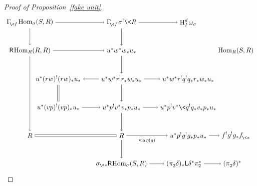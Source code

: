 \documentclass{compositio}
\theoremstyle{plain}
\theoremstyle{definition}
\theoremstyle{remark}
\numberwithin{equation}{thm}
\begin{document}
\begin{proof}[Proof of Proposition~\ref{fake unit}]
\[ \begin{tikzpicture}[xscale=3.75, yscale=1.5]

   \node(11) at (1,-1){$\Gamma^{}_{\!{\mkern-1mu}\<I}{\mkern-1mu}\operatorname{Hom}_\sigma(S,R)$};   
   \node(12) at (2.29,-1){$\Gamma^{}_{\!{\mkern-1mu}\<I}{\mkern1mu}{\mkern1mu}\sigma^!\<R$};
   \node(13) at (3.23,-1){$\textup{H}^d_I\,\omega_\sigma$};
  
  
   \node(21) at (1,-2){${\mathsf R}{\mkern-1mu}{\mkern-1mu}\operatorname{Hom}_R(R,R)$};
   \node(22) at (2.29,-2){$u^*w^*w_*u_*$};
   \node(24) at (3.9,-2){$\operatorname{Hom}_R(S,R)$}; 
    
   \node(31) at (1.4,-3){$u^*(rw)^!(rw)_*u_*$};
   \node(32) at (2.29,-3){$u^*w^*r^!r_*w_*u_*$};
   \node(33) at (3.23,-3){$u^*w^*r^!q^!q_*r_*w_*u_*$};
     
   \node(41) at (1.4,-4){$u^*(vp)^!(vp)_*u_*$};
   \node(42) at (2.29,-4){$u^*p^!v^*v_*p_*u_*$};   
   \node(43) at (3.23,-4){$u^*p^!v^*\<q^!q_*v_*p_*u_*$};   
     
   \node(51) at (1,-5){$R$};
   \node(52) at (2.29,-5){$R$};
   \node(53) at (3.23,-5){$u^*p^!g^!g_*p_*u_*$};
   \node(54) at (3.9,-5){$f^!g^!g_*{{f^{}_{{\mkern-1mu}\<*}}}$};     

   \node(62) at (2.29,-6){$\sigma_{{\mkern-1mu}\<*}{\mathsf R}{\mkern-1mu}{\mkern-1mu}\operatorname{Hom}_\sigma(S,R)$};
   \node(63) at (3.17,-6){$(\pi^{}_2\delta)_*{\mathsf L}\delta^*\pi_2^*$};
   \node(64) at (3.85,-6){$(\pi^{}_2\delta)^*$};     

 
	  
	   \draw[->] (11)--(12) ;
	   \draw[->] (12)--(13) ;  
                  
	   \draw[->] (21)--(22) ; 

	   \draw[<-] (31)--(32) ;
	   \draw[->] (32)--(33) ; 
	   
	   \draw[->] (41)--(42) ;
	   \draw[->] (42)--(43) ;
	 
	   \draw[double distance=2pt] (51)--(52) ;	   
	   \draw[->] (52)--(53) node[below=1pt, midway, scale=.75]{$\operatorname{{\textup{via}}}\eta(g)$}; 
	   \draw[->] (53)--(54) ; 

	   \draw[->] (62)--(63) ;
	   \draw[->] (63)--(64) ;  	   
	 
 
	   \draw[->] (11)--(21) ;
	   \draw[->] (21)--(51) ;
	   
	   \draw[double distance=2pt] (31)--(41) ;
	   
	   \draw[->] (12)--(22) ;
	   \draw[->] (22)--(32) ;
	   \draw[->] (32)--(42) ;
           \draw[->] (42)--(52) ;
	   \draw[->] (52)--(62) ;	
	    

\end{tikzpicture}\]
\end{proof}
\end{document}

